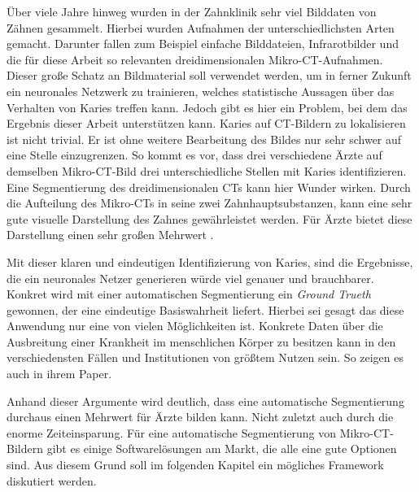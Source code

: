 Über viele Jahre hinweg wurden in der Zahnklinik sehr viel Bilddaten von Zähnen
gesammelt. Hierbei wurden Aufnahmen der unterschiedlichsten Arten gemacht.
Darunter fallen zum Beispiel einfache Bilddateien, Infrarotbilder und die für diese
Arbeit so relevanten dreidimensionalen Mikro-CT-Aufnahmen. Dieser große Schatz
an Bildmaterial soll verwendet werden, um in ferner Zukunft ein neuronales Netzwerk
zu trainieren, welches statistische Aussagen über das Verhalten von Karies
treffen kann. Jedoch gibt es hier ein Problem, bei dem das Ergebnis dieser
Arbeit unterstützen kann. Karies auf \ac{CT}-Bildern zu lokalisieren ist nicht
trivial. Er ist ohne weitere Bearbeitung des Bildes nur sehr schwer auf eine Stelle
einzugrenzen. So kommt es vor, dass drei verschiedene Ärzte auf demselben Mikro-\ac{CT}-Bild
drei unterschiedliche Stellen mit Karies identifizieren. Eine Segmentierung des dreidimensionalen
\ac{CT}s kann hier Wunder wirken. Durch die Aufteilung des Mikro-\ac{CT}s in
seine zwei Zahnhauptsubstanzen, kann eine sehr gute visuelle Darstellung des Zahnes
gewährleistet werden. Für Ärzte bietet diese Darstellung einen sehr großen
Mehrwert \citep[vgl.][S.~1]{walter2025projekt}.

Mit dieser klaren und eindeutigen Identifizierung von Karies, sind die
Ergebnisse, die ein neuronales Netzer generieren würde viel genauer und brauchbarer.
Konkret wird mit einer automatischen Segmentierung ein \textit{Ground Trueth} gewonnen,
der eine eindeutige Basiswahrheit liefert. Hierbei sei gesagt das diese Anwendung
nur eine von vielen Möglichkeiten ist. Konkrete Daten über die Ausbreitung einer
Krankheit im menschlichen Körper zu besitzen kann in den verschiedensten Fällen
und Institutionen von größtem Nutzen sein. So zeigen es auch \citet[S.~207]{de20083d}
in ihrem Paper.

Anhand dieser Argumente wird deutlich, dass eine automatische Segmentierung durchaus
einen Mehrwert für Ärzte bilden kann. Nicht zuletzt auch durch die enorme
Zeiteinsparung. Für eine automatische Segmentierung von Mikro-\ac{CT}-Bildern
gibt es einige Softwarelösungen am Markt, die alle eine gute Optionen sind. Aus
diesem Grund soll im folgenden Kapitel ein mögliches Framework diskutiert werden.

